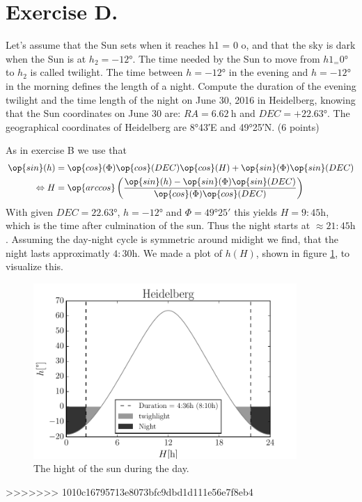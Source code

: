 \documentclass[11pt,a4paper,twoside]{article}
\begin{document}
\section*{Exercise D.}

Let's assume that the Sun sets when it reaches h1 = 0 o, and that the sky is
dark when the Sun is at $h_2 = \ang{-12}$. The time needed by the Sun to 
move from $h1_ = \ang{0}$ to $h_2$ is called twilight. The time between 
$h = \ang{-12}$ in the evening and $h = \ang{-12}$ in the 
morning defines the length of a night.
Compute the duration of the evening twilight and the time length of the night 
on June 30, 2016 in Heidelberg, knowing that the Sun coordinates on June 30 
are: $RA = \SI{6.62}{\hour}$ and $DEC = +\ang{22.63}.$
The geographical coordinates of Heidelberg are \ang{8;43;}E and \ang{49;25;}N. (6 points)

As in exercise B we use that 
\begin{align}
    \op{sin}(h) &=  \op{cos}(\Phi)\op{cos}(DEC)\op{cos}(H) + 
                    \op{sin}(\Phi)\op{sin}(DEC) \\
    \Leftrightarrow H &=   \op{arccos} \left(
                            \frac{\op{sin}(h) - \op{sin}(\Phi)\op{sin}(DEC)}
                                 {\op{cos}(\Phi)\op{cos}(DEC)} \right)
\end{align}
With given $DEC = \ang{22.63}$, $h = \ang{-12}$ and $\Phi = \ang{49;25;}$ 
this yields $H = 9:45\si{\hour}$, which is the time after culmination of the 
sun. Thus the night starts at $\approx 21:45\si{\hour}$. Assuming the day-night 
cycle is symmetric around midight we find, that the night lasts approximatly
$4:30 \si{\hour}$. We made a plot of $h(H)$, shown in figure \ref{fig:h}, 
to visualize this.

\begin{figure}
\centering
\includegraphics[width=10cm]{pic/night}
\caption{The hight of the sun during the day.}
\label{fig:h}
\end{figure}
>>>>>>> 1010c16795713e8073bfc9dbd1d111e56e7f8eb4
\end{document}
